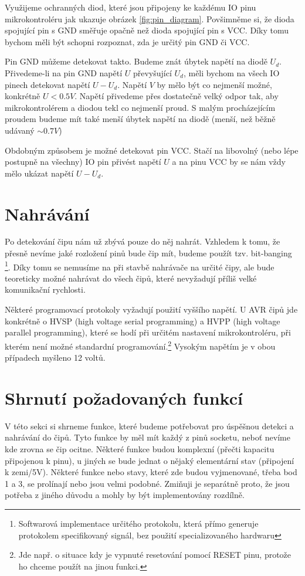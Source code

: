 \documentclass[11pt,a4paper,twoside,openright]{report}
\begin{document}
Využijeme ochranných diod, které jsou připojeny ke každému IO pinu mikrokontroléru jak ukazuje obrázek \ref{fig:pin_diagram}. Povšimněme si, že dioda spojující pin s GND směřuje opačně než dioda spojující pin s VCC. Díky tomu bychom měli být schopni rozpoznat, zda je určitý pin GND či VCC.

Pin GND můžeme detekovat takto. Budeme znát úbytek napětí na diodě $U_d$. Přivedeme-li na pin GND napětí $U$ převyšující $U_d$, měli bychom na všech IO pinech detekovat napětí $U-U_d$. Napětí $V$ by mělo být co nejmenší možné, konkrétně $U<0.5V$. Napětí přivedeme přes dostatečně velký odpor tak, aby mikrokontrolérem a diodou tekl co nejmenší proud. S malým procházejícím proudem budeme mít také menší úbytek napětí na diodě (menší, než běžně udávaný $\sim0.7V$)

Obdobným způsobem je možné detekovat pin VCC. Stačí na libovolný (nebo lépe postupně na všechny) IO pin přivést napětí $U$ a na pinu VCC by se nám vždy mělo ukázat napětí $U-U_d$.

\section {Nahrávání}

Po detekování čipu nám už zbývá pouze do něj nahrát. Vzhledem k tomu, že přesně nevíme jaké rozložení pinů bude čip mít, budeme použít tzv. bit-banging \footnote{Softwarová implementace určitého protokolu, která přímo generuje protokolem specifikovaný signál, bez použití specializovaného hardwaru}. Díky tomu se nemusíme na při stavbě nahrávače na určité čipy, ale bude teoreticky možné nahrávat do všech čipů, které nevyžadují příliš velké komunikační rychlosti. 

Některé programovací protokoly vyžadují použití vyššího napětí. U AVR čipů jde konkrétně o HVSP (high voltage serial programming) a HVPP (high voltage parallel programming), které se hodí při určitém nastavení mikrokontroléru, při kterém není možné standardní programování.\footnote{Jde např. o situace kdy je vypnuté resetování pomocí RESET pinu, protože ho chceme použít na jinou funkci.} Vysokým napětím je v obou případech myšleno 12 voltů.\cite{AVRprog}

\section {Shrnutí požadovaných funkcí\label{pinFunc}}

V této sekci si shrneme funkce, které budeme potřebovat pro úspěšnou detekci a nahrávání do čipů. Tyto funkce by měl mít každý z pinů socketu, neboť nevíme kde zrovna se čip ocitne. Některé funkce budou komplexní (přečti kapacitu připojenou k pinu), u jiných se bude jednat o nějaký elementární stav (připojení k zemi/5V). Některé funkce nebo stavy, které zde budou vyjmenované, třeba bod 1 a 3, se prolínají nebo jsou velmi podobné. Zmiňuji je separátně proto, že jsou potřeba z jiného důvodu a mohly by být implementovány rozdílně.
\end{document}
